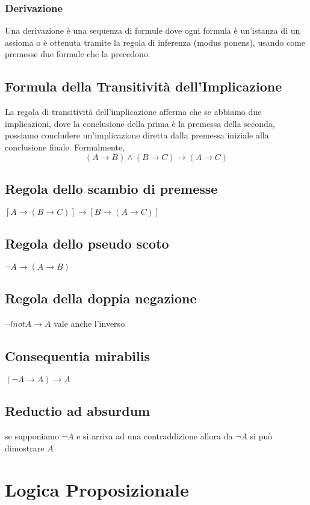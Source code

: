 \documentclass{article}
\begin{document}
\subsubsection{Derivazione}
Una derivazione è una sequenza di formule dove ogni formula è un'istanza di un assioma o è ottenuta tramite la regola di inferenza (modus ponens), usando come premesse due formule che la precedono.

\subsection{Formula della Transitività dell'Implicazione}
La regola di transitività dell'implicazione afferma che se abbiamo due implicazioni, dove la conclusione della prima è la premessa della seconda, possiamo concludere un'implicazione diretta dalla premessa iniziale alla conclusione finale. Formalmente, 
\[(A \to B) \land (B \to C) \to (A \to C)\]

\subsection{Regola dello scambio di premesse}
$[A \to (B \to C)] \to [B \to (A \to C)]$

\subsection{Regola dello pseudo scoto}
$\lnot A \to (A \to B)$

\subsection{Regola della doppia negazione}
$\lnot lnot A \to A$ vale anche l'inverso

\subsection{Consequentia mirabilis}
$(\lnot A \to A) \to A$

\subsection{Reductio ad absurdum}
se supponiamo $\lnot A$ e si arriva ad una contraddizione allora da $\lnot A$ si può dimostrare $A$

\newpage
\section{Logica Proposizionale}
\end{document}
